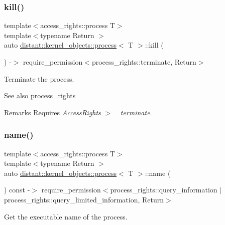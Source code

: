 \subsubsection{\texorpdfstring{kill()}{kill()}}
{\footnotesize\ttfamily template$<$access\+\_\+rights\+::process T$>$ \\
template$<$typename Return $>$ \\
auto \mbox{\hyperlink{classdistant_1_1kernel__objects_1_1process}{distant\+::kernel\+\_\+objects\+::process}}$<$ T $>$\+::kill (\begin{DoxyParamCaption}{ }\end{DoxyParamCaption}) -\/$>$ require\+\_\+permission$<$process\+\_\+rights\+::terminate, Return$>$}



Terminate the process. 

\begin{DoxySeeAlso}{See also}
process\+\_\+rights 
\end{DoxySeeAlso}
\begin{DoxyRemark}{Remarks}
Requires {\itshape Access\+Rights} $>$= {\itshape terminate}. 
\end{DoxyRemark}
\mbox{\label{classdistant_1_1kernel__objects_1_1process_a380d7b1f70e856105848af6a9ae60d88}} 
\subsubsection{\texorpdfstring{name()}{name()}}
{\footnotesize\ttfamily template$<$access\+\_\+rights\+::process T$>$ \\
template$<$typename Return $>$ \\
auto \mbox{\hyperlink{classdistant_1_1kernel__objects_1_1process}{distant\+::kernel\+\_\+objects\+::process}}$<$ T $>$\+::name (\begin{DoxyParamCaption}{ }\end{DoxyParamCaption}) const -\/$>$ require\+\_\+permission$<$process\+\_\+rights\+::query\+\_\+information $\vert$ process\+\_\+rights\+::query\+\_\+limited\+\_\+information, Return$>$}



Get the executable name of the process. 

